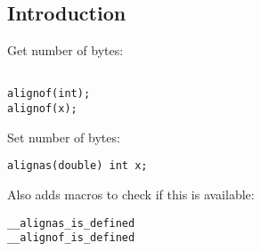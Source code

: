 
\subsection{Introduction}

Get number of bytes:

\begin{verbatim}

alignof(int);
alignof(x);

\end{verbatim}


Set number of bytes:

\begin{verbatim}
alignas(double) int x;
\end{verbatim}


Also adds macros to check if this is available:

\begin{verbatim}
__alignas_is_defined
__alignof_is_defined
\end{verbatim}

